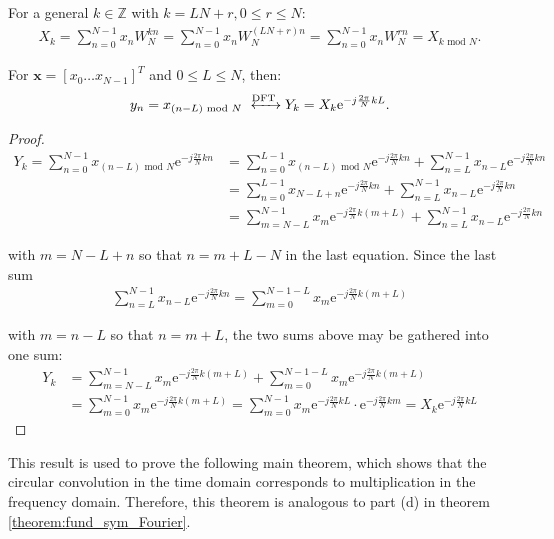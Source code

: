 For a general $k\in\mathbb{Z}$ with $k = LN + r, 0 \leq r \leq N$:
\begin{align*}
X_k = \sum_{n=0}^{N-1} x_n W_N^{kn} = \sum_{n=0}^{N-1} x_n W_N^{(LN+r)n} = \sum_{n=0}^{N-1} x_n W_N^{rn} = X_{k \text{ mod } N}.
\end{align*}

\begin{lemma}
For $\textbf{x} = [x_0 \dots x_{N-1}]^T$ and $0 \leq L \leq N$, then:
\begin{align*}
y_n  = x_{(n-L) \text{ mod } N} \xleftrightarrow{\text{DFT}} Y_k = X_k \text{e}^{-j\frac{2\pi}{N} kL}.
\end{align*}
\end{lemma}

\begin{proof}
\begin{align*}
Y_k = \sum_{n=0}^{N-1} x_{(n-L) \text{ mod } N} \text{e}^{-j\frac{2\pi}{N} kn} &= \sum_{n=0}^{L-1} x_{(n-L) \text{ mod } N}\text{e}^{-j\frac{2\pi}{N} kn} + \sum_{n=L}^{N-1} x_{n-L}\text{e}^{-j\frac{2\pi}{N} kn} \\
&= \sum_{n=0}^{L-1} x_{N-L+n}\text{e}^{-j\frac{2\pi}{N} kn} + \sum_{n=L}^{N-1} x_{n-L}\text{e}^{-j\frac{2\pi}{N} kn} \\
&= \sum_{m=N-L}^{N-1} x_{m}\text{e}^{-j\frac{2\pi}{N} k(m+L)} + \sum_{n=L}^{N-1} x_{n-L}\text{e}^{-j\frac{2\pi}{N} kn}
\end{align*}

with $m = N - L + n$ so that $n = m + L - N$ in the last equation. Since the last sum
\begin{align*}
\sum_{n=L}^{N-1} x_{n-L}\text{e}^{-j\frac{2\pi}{N} kn} = \sum_{m=0}^{N-1-L} x_m \text{e}^{-j\frac{2\pi}{N}k(m+L)}
\end{align*}

with $m = n - L$ so that $n = m + L$, the two sums above may be gathered into one sum:
\begin{align*}
Y_k &= \sum_{m=N-L}^{N-1} x_{m}\text{e}^{-j\frac{2\pi}{N} k(m+L)} + \sum_{m=0}^{N-1-L} x_m \text{e}^{-j\frac{2\pi}{N}k(m+L)}  \\
&= \sum_{m=0}^{N-1} x_m \text{e}^{-j\frac{2\pi}{N}k(m+L)} = \sum_{m=0}^{N-1} x_m \text{e}^{-j\frac{2\pi}{N}kL} \cdot \text{e}^{-j\frac{2\pi}{N}km} = X_k \text{e}^{-j\frac{2\pi}{N}kL}
\end{align*}
\end{proof}

This result is used to prove the following main theorem, which shows that the circular convolution in the time domain corresponds to multiplication in the frequency domain. Therefore, this theorem is analogous to part (d) in theorem \ref{theorem:fund_sym_Fourier}.

